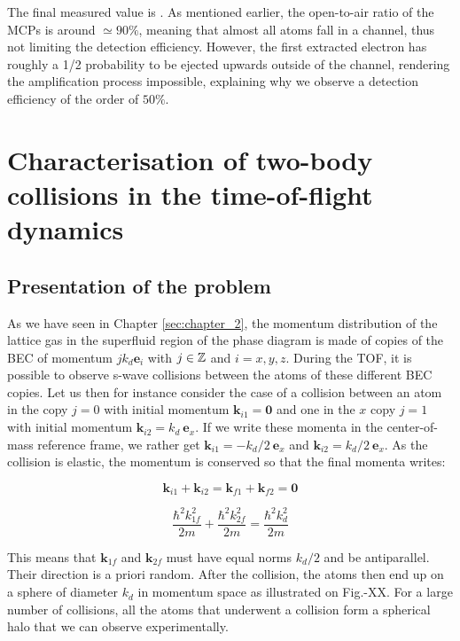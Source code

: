 \noindent The final measured value is . As mentioned earlier, the open-to-air ratio of the MCPs is around $\simeq 90 \%$, meaning that almost all atoms fall in a channel, thus not limiting the detection efficiency. However, the first extracted electron has roughly a 1/2 probability to be ejected upwards outside of the channel, rendering the amplification process impossible, explaining why we observe a detection efficiency of the order of $50 \%$.



\section{Characterisation of two-body collisions in the time-of-flight dynamics}


\subsection{Presentation of the problem}

As we have seen in Chapter \ref{sec:chapter_2}, the momentum distribution of the lattice gas in the superfluid region of the phase diagram is made of copies of the BEC of momentum $j k_d \bm{e}_i$ with $j \in \mathbb{Z}$ and $i=x,y,z$. During the TOF, it is possible to observe s-wave collisions between the atoms of these different BEC copies. Let us then for instance consider the case of a collision between an atom in the copy $j=0$ with initial momentum $\bm{k}_{i1}=\bm{0}$ and one in the $x$ copy $j=1$ with initial momentum $\bm{k}_{i2}=k_d \ \bm{e}_x$. If we write these momenta in the center-of-mass reference frame, we rather get $\bm{k}_{i1}=-k_d/2 \ \bm{e}_x$ and $ \bm{k}_{i2}=k_d/2 \ \bm{e}_x$. As the collision is elastic, the momentum is conserved so that the final momenta writes:

\begin{equation}
    \bm{k}_{i1}+\bm{k}_{i2}=\bm{k}_{f1}+\bm{k}_{f2}=\bm{0}
\end{equation}

\begin{equation}
    \frac{\hbar^2 k^2_{1f}}{2m} + \frac{\hbar^2 k^2_{2f}}{2m} =  \frac{\hbar^2 k_d^2}{2m}
\end{equation}

\noindent This means that $\bm{k}_{1f}$ and $\bm{k}_{2f}$ must have equal norms $k_d/2$ and be antiparallel. Their direction is a priori random. After the collision, the atoms then end up on a sphere of diameter $k_d$ in momentum space as illustrated on Fig.-XX. For a large number of collisions, all the atoms that underwent a collision form a spherical halo that we can observe experimentally.

